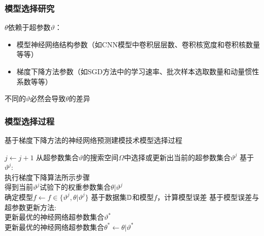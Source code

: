 \begin{frame}
    \frametitle{模型选择研究}

    \(\theta\)依赖于超参数\(\vartheta\)：
    \begin{itemize}
        \item 模型神经网络结构参数（如CNN模型中卷积层层数、卷积核宽度和卷积核数量等等）
        \item 梯度下降方法参数（如SGD方法中的学习速率、批次样本选取数量和动量惯性系数等等）
    \end{itemize}

    \begin{center}
        不同的\(\vartheta\)必然会导致\(\theta\)的差异
    \end{center}

\end{frame}

\begin{frame}
    \frametitle{模型选择过程}
\begin{algorithm}[H]
    \caption{基于梯度下降方法的神经网络预测建模技术模型选择过程}
    \begin{algorithmic}[1]

        \STATE \(j\leftarrow j+1\)
        \STATE 从超参数集合\(\vartheta\)的搜索空间\(\Omega\)中选择或更新出当前的超参数集合\(\vartheta^j\)
        \STATE 基于\(\vartheta^j\):\\
        \hspace{2em}执行梯度下降算法所示步骤\\
        \hspace{2em}得到当前\(\vartheta^j\)试验下的权重参数集合\(\theta|\vartheta^j\)\\
        \hspace{2em}确定模型\(f \leftarrow  f \in \{\vartheta^j, \theta|\vartheta^j\}\)
        \STATE 基于数据集\(\mathbb{D}\)和模型\(f\)，计算模型误差
        \STATE 基于模型误差与超参数更新方法:\\
        \hspace{2em}更新最优的神经网络超参数集合\(\vartheta^*\)\\
        \hspace{2em}更新最优的神经网络超参数集合\(\theta^* \leftarrow  \theta|\vartheta^*\)
        \ENDWHILE
    \end{algorithmic}
\end{algorithm}   

\end{frame}

